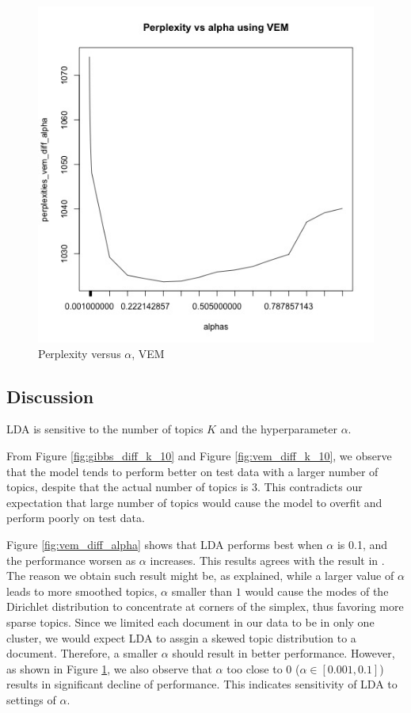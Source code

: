 \documentclass{article}
\begin{document}
\begin{figure}[H]
  \centering
  \includegraphics[width=0.5\linewidth]{images/vem_diff_alpha_small.jpg}
  \caption{Perplexity versus $\alpha$, VEM}
  \label{fig:vem_diff_alpha_small}
\end{figure}


\subsection{Discussion}

LDA is sensitive to the number of topics $K$ and the hyperparameter $\alpha$.

From Figure \ref{fig:gibbs_diff_k_10} and Figure \ref{fig:vem_diff_k_10}, we observe that the model tends to perform better on test data with a larger number of topics, despite that the actual number of topics is 3. This contradicts our expectation that large number of topics would cause the model to overfit and perform poorly on test data.

Figure \ref{fig:vem_diff_alpha} shows that LDA performs best when $\alpha$ is 0.1, and the performance worsen as $\alpha$ increases. This results agrees with the result in \cite{lu2011investigating}. The reason we obtain such result might be, as \cite{lu2011investigating} explained, while a larger value of $\alpha$ leads to more smoothed topics, $\alpha$ smaller than $1$ would cause the modes of the Dirichlet distribution to concentrate at corners of the simplex, thus favoring more sparse topics. Since we limited each document in our data to be in only one cluster, we would expect LDA to assgin a skewed topic distribution to a document. Therefore, a smaller $\alpha$ should result in better performance. However, as shown in Figure \ref{fig:vem_diff_alpha_small}, we also observe that $\alpha$ too close to $0$ ($\alpha \in [0.001, 0.1]$) results in significant decline of performance. This indicates sensitivity of LDA to settings of $\alpha$. 
\end{document}
